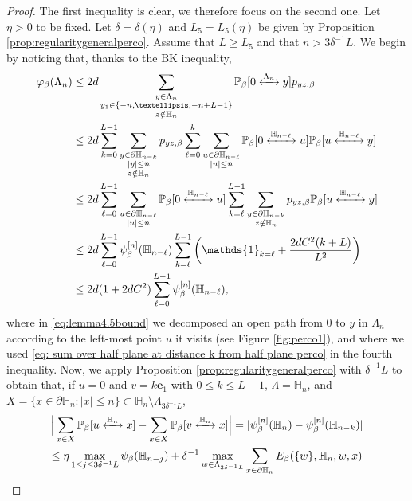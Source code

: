 \documentclass[11pt,a4paper]{article}
\numberwithin{equation}{section}
\theoremstyle{plain}
\theoremstyle{definition}
\newcommand{\connect}{\xleftrightarrow}
\begin{document}
\begin{proof} The first inequality is clear, we therefore focus on the second one. Let $\eta>0$ to be fixed. Let $\delta=\delta(\eta)$ and $L_5=L_5(\eta)$ be given by Proposition \ref{prop:regularitygeneralperco}. Assume that $L\geq L_5$ and that $n> 3\delta^{-1}L$. 
We begin by noticing that, thanks to the BK inequality,
\begin{align}
	\varphi_\beta(\Lambda_n)
	&\leq 2d\sum_{\substack{y\in \Lambda_n\\
	y_1\in \{-n,\ldots,-n+L-1\}\\z\notin \mathbb H_n}}\mathbb P_\beta[0\connect{\Lambda_n\:}y]p_{yz,\beta}\notag
	\\&\leq 2d\sum_{k=0}^{L-1}\sum_{\substack{y\in \partial\mathbb H_{n-k}\\|y|\leq n\\ z\notin \mathbb H_n}}p_{yz,\beta}\sum_{\ell=0}^k\sum_{\substack{u\in \partial\mathbb H_{n-\ell}\\|u|\leq n}}\mathbb P_\beta[0\connect{\mathbb H_{n-\ell}\:}u]\mathbb P_\beta[u\connect{\mathbb H_{n-\ell}\:}y]\label{eq:lemma4.5bound}	\\&\leq 2d\sum_{\ell=0}^{L-1}\sum_{\substack{u\in \partial \mathbb H_{n-\ell}\\|u|\leq n}}\mathbb P_\beta[0\connect{\mathbb H_{n-\ell}\:}u]\sum_{k=\ell}^{L-1}\sum_{\substack{y\in \partial\mathbb H_{n-k}\\z\notin \mathbb H_n}}p_{yz,\beta}\mathbb P_\beta[u\connect{\mathbb H_{n-\ell}\:}y]\notag
	\\&\leq 2d\sum_{\ell=0}^{L-1}\psi_\beta^{[n]}(\mathbb H_{n-\ell})\sum_{k=\ell}^{L-1}\left(\mathds{1}_{k=\ell}+\frac{2dC^2(k+L)}{L^2}\right)\notag
	\\&\leq 2d(1+2dC^2)\sum_{\ell=0}^{L-1}\psi_\beta^{[n]}(\mathbb H_{n-\ell})\label{eq:proof lower bound psi1},
\end{align}
where in \eqref{eq:lemma4.5bound} we decomposed an open path from $0$ to $y$ in $\Lambda_n$ according to the left-most point $u$ it visits (see Figure \ref{fig:perco1}), and where we used \eqref{eq: sum over half plane at distance k from half plane perco} in the fourth inequality. Now, we apply Proposition \ref{prop:regularitygeneralperco} with $\delta^{-1}L$ to obtain that, if $u=0$ and $v=k\mathbf{e}_1$ with $0\leq k \leq L-1$, $\Lambda=\mathbb H_n$, and $X=\{x\in \partial \mathbb H_n: |x|\leq n\}\subset \mathbb H_n\setminus \Lambda_{3\delta^{-1}L}$,
\begin{multline}
	\Big|\sum_{x\in X}\mathbb P_\beta[u\connect{\mathbb H_n\:}x]-\sum_{x\in X}\mathbb P_\beta[v\connect{\mathbb H_n\:}x]\Big|=|\psi^{[n]}_\beta(\mathbb H_n)-\psi^{[n]}_\beta(\mathbb H_{n-k})|\\\leq \eta \max_{1\leq j \leq 3\delta^{-1}L}\psi_\beta(\mathbb H_{n-j})+\delta^{-1}\max_{w\in \Lambda_{3\delta^{-1}L}}\sum_{x\in \partial \mathbb H_n}E_\beta(\{w\},\mathbb H_n,w,x)

\end{multline}
\end{proof}
\end{document}
